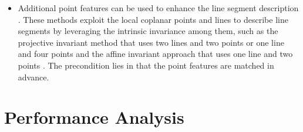 \documentclass[journal,compsoc]{IEEEtran}
\begin{document}
\begin{itemize}
	\item Additional point features can be used to enhance the line segment description \cite{MatchingDisparateViewsofPlanarSurfacesusingProjectiveInvariants,Linematchingleveragedbypointcorrespondences,Robustlinematchingthroughlinepointinvariants,Scaleinvariantlinematchingonthesphere,Line-sweep,NovelCoplanarLinePointsInvariantsforRobustLineMatchingAcrossViews,Dude}. These methods exploit the local coplanar points and lines to describe line segments by leveraging the intrinsic invariance among them, such as the projective invariant method that uses two lines and two points \cite{MatchingDisparateViewsofPlanarSurfacesusingProjectiveInvariants} or one line and four points \cite{Robustlinematchingthroughlinepointinvariants} and the affine invariant approach that uses one line and two points \cite{Linematchingleveragedbypointcorrespondences, Robustlinematchingthroughlinepointinvariants}. The precondition lies in that the point features are matched in advance.
\end{itemize}




\section{Performance Analysis}
\label{sec_performance}
\end{document}
